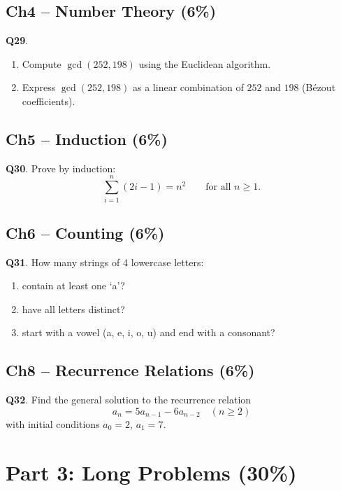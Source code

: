 \documentclass[11pt,a4paper,fontset=mac]{ctexart}
\newcommand{\question}[1]{\textbf{Q#1}.}
\begin{document}
\subsection*{Ch4 -- Number Theory (6\%)}

\question{29}
\begin{enumerate}[label=(\alph*)]
  \item Compute $\gcd(252,198)$ using the Euclidean algorithm.
  \item Express $\gcd(252,198)$ as a linear combination of $252$ and $198$
        (B\'{e}zout coefficients).
\end{enumerate}
\bigskip

\subsection*{Ch5 -- Induction (6\%)}

\question{30}  Prove by induction:
\[
\sum_{i=1}^{n}(2i-1)=n^{2}\qquad\text{for all }n\ge 1.
\]
\bigskip

\subsection*{Ch6 -- Counting (6\%)}

\question{31}  How many strings of 4 lowercase letters:
\begin{enumerate}[label=(\alph*)]
  \item contain at least one `a'?
  \item have all letters distinct?
  \item start with a vowel (a, e, i, o, u) and end with a consonant?
\end{enumerate}
\bigskip

\subsection*{Ch8 -- Recurrence Relations (6\%)}

\question{32}  Find the general solution to the recurrence relation
\[
a_n = 5a_{n-1}-6a_{n-2}\quad(n\ge 2)
\]
with initial conditions $a_0=2$, $a_1=7$.
\bigskip

\section*{Part 3: Long Problems (30\%)}
\end{document}
